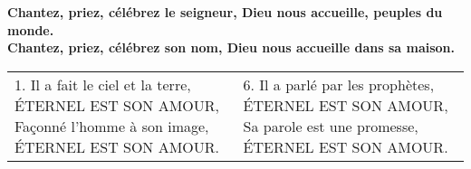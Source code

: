 \textbf{
Chantez, priez, célébrez le seigneur,
Dieu nous accueille, peuples du monde.\\
Chantez, priez, célébrez son nom,
Dieu nous accueille dans sa maison.
}

\begin{tabular}{p{} p{}}
1.
Il a fait le ciel et la terre,\newline
ÉTERNEL EST SON AMOUR,\newline
Façonné l’homme à son image,\newline
ÉTERNEL EST SON AMOUR.
&
%
%
%

6.
Il a parlé par les prophètes,\newline
ÉTERNEL EST SON AMOUR,\newline
Sa parole est une promesse,\newline
ÉTERNEL EST SON AMOUR.
\end{tabular}
